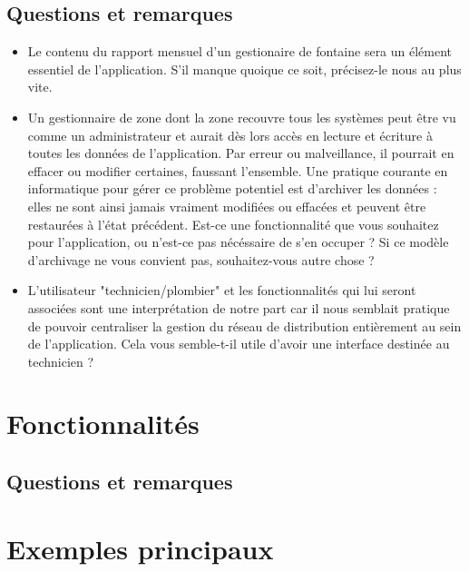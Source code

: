 \documentclass[a4paper, 11pt]{article}
\begin{document}
  \subsection{Questions et remarques}
  \begin{itemize}
    \item Le contenu du rapport mensuel d'un gestionaire de fontaine sera un élément essentiel de l'application. S'il manque quoique ce soit, précisez-le nous au plus vite.
    \item Un gestionnaire de zone dont la zone recouvre tous les systèmes peut être vu comme un administrateur et aurait dès lors accès en lecture et écriture à toutes les données de l'application. Par erreur ou malveillance, il pourrait en effacer ou modifier certaines, faussant l'ensemble. Une pratique courante en informatique pour gérer ce problème potentiel est d'archiver les données : elles ne sont ainsi jamais vraiment modifiées ou effacées et peuvent être restaurées à l'état précédent. Est-ce une fonctionnalité que vous souhaitez pour l'application, ou n'est-ce pas nécéssaire de s'en occuper ? Si ce modèle d'archivage ne vous convient pas, souhaitez-vous autre chose ?
    \item L'utilisateur "technicien/plombier" et les fonctionnalités qui lui seront associées sont une interprétation de notre part car il nous semblait pratique de pouvoir centraliser la gestion du réseau de distribution entièrement au sein de l'application. Cela vous semble-t-il utile d'avoir une interface destinée au technicien ?
  \end{itemize}

\section{Fonctionnalités}
  \subsection{Questions et remarques}
\section{Exemples principaux}
\end{document}
